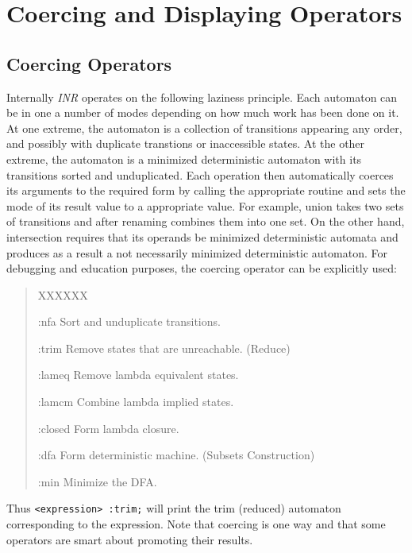 \section{Coercing and Displaying Operators}
\subsection{Coercing Operators}
Internally {\em INR} operates on the following laziness principle.
Each automaton can be in one a number of modes depending on how much work
has been done on it.
At one extreme, the automaton is a collection of transitions appearing any
order, and possibly with duplicate transtions or inaccessible states.
At the other extreme, the automaton is a minimized deterministic automaton
with its transitions sorted and unduplicated.
Each operation then automatically coerces its arguments to the required
form by calling the appropriate routine and sets the mode of its result
value to a appropriate value.
For example, union takes two sets of transitions and after renaming
combines them into one set.
On the other hand, intersection requires that its operands be minimized
deterministic automata and produces as a result a not necessarily minimized
deterministic automaton.
For debugging and education purposes, the coercing operator can be
explicitly used:
\begin{quote}
\begin{describe}{XXXXXX}
\item[:nfa] Sort and unduplicate transitions.
\item[:trim] Remove states that are unreachable. (Reduce)
\item[:lameq] Remove lambda equivalent states.
\item[:lamcm] Combine lambda implied states.
\item[:closed] Form lambda closure.
\item[:dfa] Form deterministic machine. (Subsets Construction)
\item[:min] Minimize the DFA.
\end{describe}
\end{quote}
Thus \verb#<expression> :trim;#
will print the trim (reduced) automaton corresponding to the expression.
Note that coercing is one way and that some operators are smart about
promoting their results.
